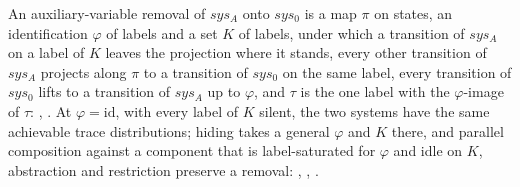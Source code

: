 \begin{definition}
  \label{def:auxiliary-variable-removal}
  \leanok
  An auxiliary-variable removal of $sys_A$ onto $sys_0$ is a map $\pi$ on states, an identification $\varphi$ of labels and a set $K$ of labels, under which a transition of $sys_A$ on a label of $K$ leaves the projection where it stands, every other transition of $sys_A$ projects along $\pi$ to a transition of $sys_0$ on the same label, every transition of $sys_0$ lifts to a transition of $sys_A$ up to $\varphi$, and $\tau$ is the one label with the $\varphi$-image of $\tau$: , .
  At $\varphi = \mathrm{id}$, with every label of $K$ silent, the two systems have the same achievable trace distributions; hiding takes a general $\varphi$ and $K$ there, and parallel composition against a component that is label-saturated for $\varphi$ and idle on $K$, abstraction and restriction preserve a removal: , , .
\end{definition}

